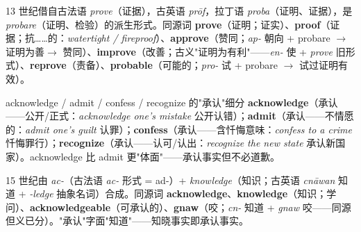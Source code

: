 \documentclass[../main.tex]{subfiles}
\begin{document}
\begin{origin}
13 世纪借自古法语 \textit{prove}（证据），古英语 \textit{prōf}，拉丁语 \textit{proba}（证明、证据），是 \textit{probare}（证明、检验）的派生形式。同源词 \textbf{prove}（证明；证实）、\textbf{proof}（证据；抗……的：\textit{watertight / fireproof}）、\textbf{approve}（赞同；\textit{ap-} 朝向 + probare $\to$ 证明为善$\to$ 赞同）、\textbf{improve}（改善；古义"证明为有利"——\textit{en-} 使 + \textit{prove} 旧形式）、\textbf{reprove}（责备）、\textbf{probable}（可能的；\textit{pro-} 试 + probare $\to$ 试过证明有效）。
\end{origin}





\begin{gram}{acknowledge / admit / confess / recognize 的"承认"细分}
\textbf{acknowledge}（承认——公开/正式：\textit{acknowledge one's mistake} 公开认错）；\textbf{admit}（承认——不情愿的：\textit{admit one's guilt} 认罪）；\textbf{confess}（承认——含忏悔意味：\textit{confess to a crime} 忏悔罪行）；\textbf{recognize}（承认——认可/认出：\textit{recognize the new state} 承认新国家）。acknowledge 比 admit 更"体面"——承认事实但不必道歉。
\end{gram}

\begin{origin}
15 世纪由 \textit{ac-}（古法语 \textit{ac-} 形式 = ad-）+ \textit{knowledge}（知识；古英语 \textit{cnāwan} 知道 + \textit{-ledge} 抽象名词）合成。同源词 \textbf{acknowledge}、\textbf{knowledge}（知识；学问）、\textbf{acknowledgeable}（可承认的）、\textbf{gnaw}（咬；\textit{cn-} 知道 + \textit{gnaw} 咬——同源但义已分）。"承认"字面"知道"——知晓事实即承认事实。
\end{origin}

\end{document}
